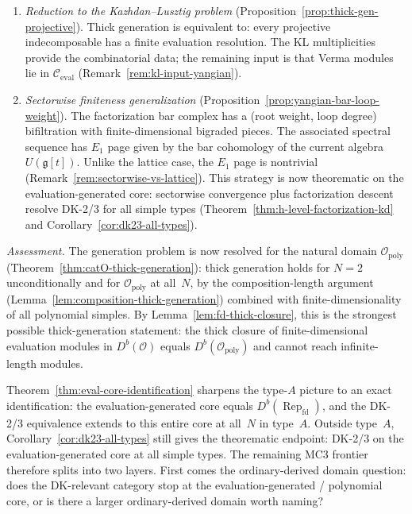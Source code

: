 \begin{remark}
\begin{enumerate}[label=\textup{(\roman*)}]
\item \emph{Reduction to the Kazhdan--Lusztig problem}
  (Proposition~\ref{prop:thick-gen-projective}).
  Thick generation is equivalent to: every projective indecomposable
  has a finite evaluation resolution.  The KL multiplicities
  provide the combinatorial data; the remaining input is that Verma
  modules lie in $\mathcal{C}_{\mathrm{eval}}$
  (Remark~\ref{rem:kl-input-yangian}).

\item \emph{Sectorwise finiteness generalization}
  (Proposition~\ref{prop:yangian-bar-loop-weight}).
  The factorization bar complex has a (root weight, loop degree)
  bifiltration with finite-dimensional bigraded pieces.  The
  associated spectral sequence has $E_1$ page given by the bar
  cohomology of the current algebra $U(\mathfrak{g}[t])$.
  Unlike the lattice case, the $E_1$ page is nontrivial
  (Remark~\ref{rem:sectorwise-vs-lattice}).
  This strategy is now theorematic on the evaluation-generated core:
  sectorwise convergence plus factorization descent resolve DK-2/3 for
  all simple types
  \textup{(}Theorem~\ref{thm:h-level-factorization-kd} and
  Corollary~\ref{cor:dk23-all-types}\textup{)}.
\end{enumerate}

\emph{Assessment.}
The generation problem is now resolved for
the natural domain $\mathcal{O}_{\mathrm{poly}}$
(Theorem~\ref{thm:catO-thick-generation}): thick generation holds
for $N = 2$ unconditionally and for
$\mathcal{O}_{\mathrm{poly}}$ at all~$N$,
by the composition-length argument
(Lemma~\ref{lem:composition-thick-generation}) combined with
finite-dimensionality of all polynomial simples.
By Lemma~\ref{lem:fd-thick-closure}, this is the strongest
possible thick-generation statement: the thick closure of
finite-dimensional evaluation modules in $D^b(\mathcal{O})$ equals
$D^b(\mathcal{O}_{\mathrm{poly}})$ and cannot reach
infinite-length modules.

Theorem~\ref{thm:eval-core-identification} sharpens the type-$A$
picture to an exact identification: the evaluation-generated core
equals $D^b(\operatorname{Rep}_{\mathrm{fd}})$, and the DK-2/3
equivalence extends to this entire core at all~$N$ in type~$A$.
Outside type~$A$, Corollary~\ref{cor:dk23-all-types} still gives the
theorematic endpoint: DK-2/3 on the evaluation-generated core at all
simple types.  The remaining MC3 frontier therefore splits into two
layers.  First comes the ordinary-derived domain question: does the
DK-relevant category stop at the evaluation-generated / polynomial
core, or is there a larger ordinary-derived domain worth naming?


\end{remark}
